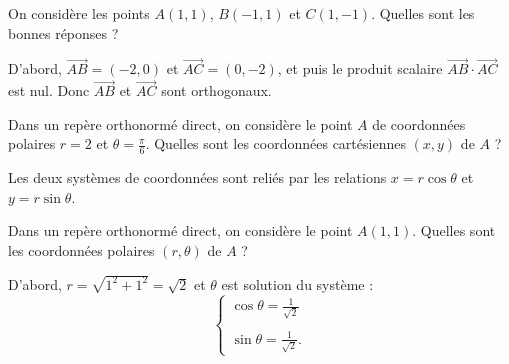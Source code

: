 \begin{question}

On considère les points $A(1,1)$, $B(-1,1)$ et $C(1,-1)$. Quelles sont les bonnes réponses ?
\begin{answers}  
\end{answers}
\begin{explanations}
D'abord, $\overrightarrow{AB}=(-2,0)$ et $\overrightarrow{AC}=(0,-2)$, et puis le produit scalaire $\overrightarrow{AB}\cdot\overrightarrow{AC}$ est nul. Donc $\overrightarrow{AB}$ et $\overrightarrow{AC}$ sont orthogonaux.
\end{explanations}
\end{question}


\begin{question}

Dans un repère orthonormé direct, on considère le point $A$ de coordonnées polaires $r=2$ et $\displaystyle \theta =\frac{\pi}{6}$. Quelles sont les coordonnées cartésiennes $(x,y)$ de $A$ ?
\begin{answers}  
\end{answers}
\begin{explanations}
Les deux systèmes de coordonnées sont reliés par les relations $x=r\cos \theta$ et $y=r\sin \theta $.
\end{explanations}
\end{question}


\begin{question}

Dans un repère orthonormé direct, on considère le point $A(1,1)$. Quelles sont les coordonnées polaires $(r,\theta)$ de $A$ ?
\begin{answers}  
\end{answers}
\begin{explanations}
D'abord, $r=\sqrt{1^2+1^2}=\sqrt{2}$ et $\theta $ est solution du système : 
$$\left\{\begin{array}{l}\displaystyle \cos \theta =\frac{1}{\sqrt{2}}\\ \\ \displaystyle \sin \theta =\frac{1}{\sqrt{2}}.\end{array}\right.$$
\end{explanations}
\end{question}


